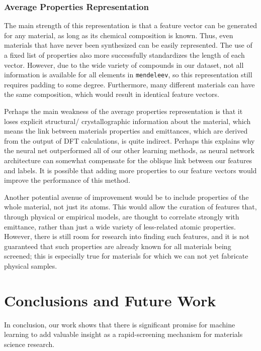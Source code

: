 \documentclass[10pt,twocolumn,letterpaper]{article}
\begin{document}
\subsubsection{Average Properties Representation}
The main strength of this representation is that a feature vector can be generated for any material, as long as its chemical composition is known. Thus, even materials that have never been synthesized can be easily represented. The use of a fixed list of properties also more successfully standardizes the length of each vector. However, due to the wide variety of compounds in our dataset, not all information is available for all elements in \texttt{mendeleev}, so this representation still requires padding to some degree. Furthermore, many different materials can have the same composition, which would result in identical feature vectors. 

Perhaps the main weakness of the average properties representation is that it loses explicit structural/ crystallographic information about the material, which means the link between materials properties and emittances, which are derived from the output of DFT calculations, is quite indirect. Perhaps this explains why the neural net outperformed all of our other learning methods, as neural network architecture can somewhat compensate for the oblique link between our features and labels. It is possible that adding  more properties to our feature vectors would improve the performance of this method. 

Another potential avenue of improvement would be to include properties of the whole material, not just its atoms. This would allow the curation of features that, through physical or empirical models, are thought to correlate strongly with emittance, rather than just a wide variety of less-related atomic properties. However, there is still room for research into finding such features, and it is not guaranteed that such properties are already known for all materials being screened; this is especially true for materials for which we can not yet fabricate physical samples.


\section{Conclusions and Future Work}

In conclusion, our work shows that there is significant promise for machine learning to add valuable insight as a rapid-screening mechanism for materials science research.
\end{document}
